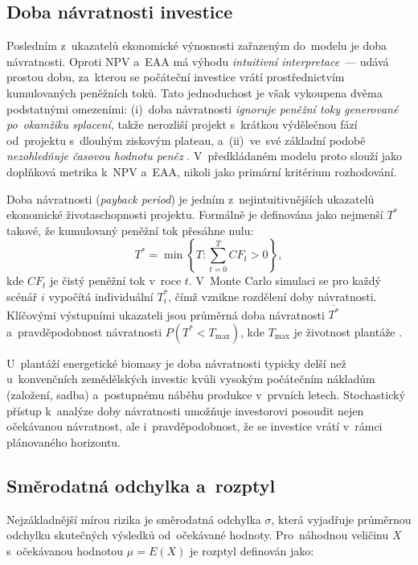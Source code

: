 \subsection{Doba návratnosti investice}
\label{subsec:doba-navratnosti}

Posledním z~ukazatelů ekonomické výnosnosti zařazeným do~modelu je
doba návratnosti. Oproti NPV a~EAA má výhodu \textit{intuitivní
interpretace}~--- udává prostou dobu, za~kterou se počáteční investice
vrátí prostřednictvím kumulovaných peněžních toků. Tato jednoduchost
je však vykoupena dvěma podstatnými omezeními: (i)~doba návratnosti
\textit{ignoruje peněžní toky generované po~okamžiku splacení}, takže
nerozliší projekt s~krátkou výdělečnou fází od~projektu s~dlouhým
ziskovým plateau, a~(ii)~ve~své základní podobě \textit{nezohledňuje
časovou hodnotu peněz} \citep{fotr_soucek_2011}. V~předkládaném modelu
proto slouží jako doplňková metrika k~NPV a~EAA, nikoli jako primární
kritérium rozhodování.


Doba návratnosti (\textit{payback period}) je jedním z~nejintuitivnějších ukazatelů ekonomické životaschopnosti projektu. Formálně je definována jako nejmenší $T^*$ takové, že kumulovaný peněžní tok přesáhne nulu:
\begin{equation}
  T^* = \min\left\{T : \sum_{t=0}^{T} CF_t > 0\right\},
  \label{eq:payback}
\end{equation}
kde $CF_t$ je čistý peněžní tok v~roce $t$. V~Monte Carlo simulaci se pro každý scénář $i$ vypočítá individuální $T_i^*$, čímž vznikne rozdělení doby návratnosti. Klíčovými výstupními ukazateli jsou průměrná doba návratnosti $\overline{T^*}$ a~pravděpodobnost návratnosti $P(T^* < T_{\max})$, kde $T_{\max}$ je životnost plantáže \cite{fotr_soucek_2011}.

U~plantáží energetické biomasy je doba návratnosti typicky delší než u~konvenčních zemědělských investic kvůli vysokým počátečním nákladům (založení, sadba) a~postupnému náběhu produkce v~prvních letech. Stochastický přístup k~analýze doby návratnosti umožňuje investorovi posoudit nejen očekávanou návratnost, ale i~pravděpodobnost, že se investice vrátí v~rámci plánovaného horizontu.

\subsection{Směrodatná odchylka a~rozptyl}
\label{subsec:smerodatna-odchylka-new}

Nejzákladnější mírou rizika je směrodatná odchylka $\sigma$, která 
vyjadřuje průměrnou odchylku skutečných výsledků od~očekávané hodnoty. 
Pro~náhodnou veličinu $X$ s~očekávanou hodnotou $\mu = E(X)$ je 
rozptyl definován jako:

